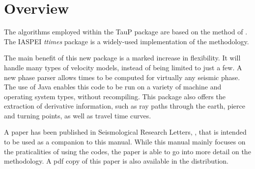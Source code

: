 
\section{Overview}


The algorithms employed within the TauP package are based on the 
method of . 
The IASPEI \textit{ttimes} package is a widely-used implementation of
the methodology.

The main benefit of this new package is a marked increase in flexibility. It
will handle many types of velocity models, instead of being limited to
just a few. A new phase parser allows times to be computed for virtually
any seismic phase. The use of Java enables
this code to be run on a variety of machine and operating system types, 
without recompiling. This package also offers
the extraction of derivative information, such as ray paths through the
earth, pierce and turning points, as well as travel time curves. 

A paper has been published in Seismological Research Letters, 
,
that is intended to be used as a companion to this manual. While this manual
mainly focuses on the praticalities of using the codes, 
the paper is able to go into more detail on the methodology. A pdf copy of
this paper is also available in the distribution.
